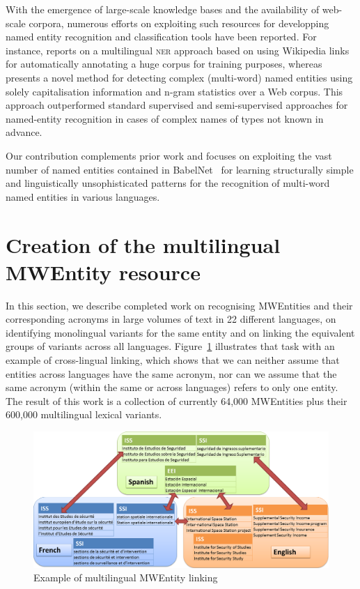 \documentclass[output=paper]{langsci/langscibook}
\begin{document}
With the emergence of large-scale knowledge bases and the availability
of web-scale corpora, numerous efforts on exploiting such resources
for developping named entity recognition and classification tools have
been reported. For instance, \citet{nothman:2013:lmn} reports on a
multilingual \textsc{ner} approach based on using Wikipedia links for
automatically annotating a huge corpus for training purposes, whereas
\citet{downey:2007:lcn} presents a novel method for detecting
complex (multi-word) named entities using solely capitalisation
information and n-gram statistics over a Web corpus. This approach
outperformed standard supervised and semi-supervised
approaches for named-entity recognition in cases of complex names of
types not known in advance.

Our contribution complements prior work and focuses on exploiting the
vast number of named entities contained in BabelNet~\citep{navigli-12}
for learning structurally simple and linguistically unsophisticated
patterns for the recognition of multi-word named entities in various
languages.
 
\section{Creation of the multilingual MWEntity resource}
\label{jac:chap10sec3}
In this section, we describe completed work \citep{jacquet-16} on recognising MWEntities and their corresponding acronyms in large volumes of text in 22 different languages, on identifying monolingual variants for the same entity and on linking the equivalent groups of variants across all languages. Figure~\ref{jac:acronym linking} illustrates that task with an example of cross-lingual linking, which shows that we can neither assume that entities across languages have the same acronym, nor can we assume that the same acronym (within the same or across languages) refers to only one entity.
The result of this work is a collection of currently 64,000 MWEntities plus their 600,000 multilingual lexical variants.

\begin{figure}
\centering
\includegraphics[scale=0.32]{figures/multiLingAcroLinking.png}
\caption{Example of multilingual MWEntity linking}
\label{jac:acronym linking}
\end{figure}
\end{document}
